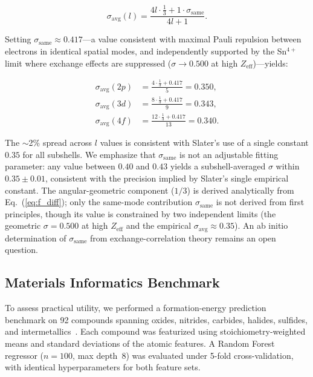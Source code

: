 \documentclass[11pt,a4paper]{article}
\begin{document}
\begin{equation}\label{eq:sigma_avg}
\sigma_{\mathrm{avg}}(l) = \frac{4l \cdot \frac{1}{3} + 1 \cdot \sigma_{\mathrm{same}}}{4l+1}.
\end{equation}

Setting $\sigma_{\mathrm{same}} \approx 0.417$---a value consistent with maximal Pauli repulsion between electrons in identical spatial modes, and independently supported by the Sn$^{4+}$ limit where exchange effects are suppressed ($\sigma \to 0.500$ at high $Z_{\mathrm{eff}}$)---yields:

\begin{align}
\sigma_{\mathrm{avg}}(2p) &= \frac{4\cdot\frac{1}{3} + 0.417}{5} = 0.350,\\
\sigma_{\mathrm{avg}}(3d) &= \frac{8\cdot\frac{1}{3} + 0.417}{9} = 0.343,\\
\sigma_{\mathrm{avg}}(4f) &= \frac{12\cdot\frac{1}{3} + 0.417}{13} = 0.340.
\end{align}

The $\sim$2\% spread across $l$ values is consistent with Slater's use of a single constant $0.35$ for all subshells. We emphasize that $\sigma_{\mathrm{same}}$ is not an adjustable fitting parameter: any value between $0.40$ and $0.43$ yields a subshell-averaged $\sigma$ within $0.35 \pm 0.01$, consistent with the precision implied by Slater's single empirical constant. The angular-geometric component ($1/3$) is derived analytically from Eq.~(\ref{eq:f_diff}); only the same-mode contribution $\sigma_{\mathrm{same}}$ is not derived from first principles, though its value is constrained by two independent limits (the geometric $\sigma=0.500$ at high $Z_{\mathrm{eff}}$ and the empirical $\sigma_{\mathrm{avg}}\approx 0.35$). An ab initio determination of $\sigma_{\mathrm{same}}$ from exchange-correlation theory remains an open question.
\subsection{Materials Informatics Benchmark}

To assess practical utility, we performed a formation-energy prediction benchmark on 92 compounds spanning oxides, nitrides, carbides, halides, sulfides, and intermetallics~\citep{matbench}. Each compound was featurized using stoichiometry-weighted means and standard deviations of the atomic features. A Random Forest regressor ($n=100$, max depth~8) was evaluated under 5-fold cross-validation, with identical hyperparameters for both feature sets.
\end{document}
